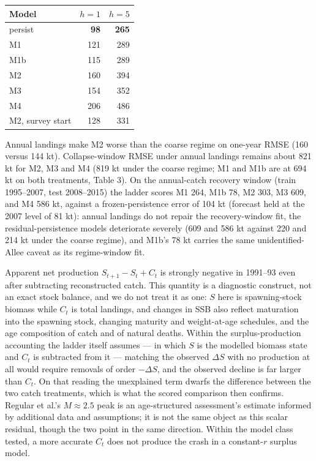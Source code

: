 \documentclass[11pt]{article}
\begin{document}
\begin{longtable}[]{@{}lrr@{}}
\toprule\noalign{}
Model & \(h=1\) & \(h=5\) \\
\midrule\noalign{}
\endhead
\bottomrule\noalign{}
\endlastfoot
persist & \textbf{98} & \textbf{265} \\
M1 & 121 & 289 \\
M1b & 115 & 289 \\
M2 & 160 & 394 \\
M3 & 154 & 352 \\
M4 & 206 & 486 \\
M2, survey start & 128 & 331 \\
\end{longtable}

Annual landings make M2 worse than the coarse regime on one-year RMSE
(160 versus 144 kt). Collapse-window RMSE under annual landings remains
about 821 kt for M2, M3 and M4 (819 kt under the coarse regime; M1 and
M1b are at 694 kt on both treatments, Table 3). On the
annual-catch recovery window (train 1995--2007, test 2008--2015) the
ladder scores M1 264, M1b 78, M2 303, M3 609, and M4 586 kt, against a
frozen-persistence error of 104 kt (forecast held at the 2007 level of
81 kt): annual landings do not repair the recovery-window fit, the
residual-persistence models deteriorate severely (609 and 586 kt against
220 and 214 kt under the coarse regime), and M1b's 78 kt carries the
same unidentified-Allee caveat as its regime-window fit.

Apparent net production \(S_{t+1}-S_t+C_t\) is strongly negative in
1991--93 even after subtracting reconstructed catch. This quantity is a
diagnostic construct, not an exact stock balance, and we do not treat it
as one: \(S\) here is spawning-stock biomass while \(C_t\) is total
landings, and changes in SSB also reflect maturation into the spawning
stock, changing maturity and weight-at-age schedules, and the age
composition of catch and of natural deaths. Within the surplus-production
accounting the ladder itself assumes --- in which \(S\) is the modelled
biomass state and \(C_t\) is subtracted from it --- matching the observed
\(\Delta S\) with no production at all would require removals of order
\(-\Delta S\), and the observed decline is far larger than \(C_t\). On
that reading the unexplained term dwarfs the difference between the two
catch treatments, which is what the scored comparison then confirms.
Regular et al.'s \(M \approx 2.5\) peak is an age-structured assessment's
estimate informed by additional data and assumptions; it is not the same
object as this scalar residual, though the two point in the same
direction. Within the model class tested, a more accurate \(C_t\) does
not produce the crash in a constant-\(r\) surplus model.
\end{document}
